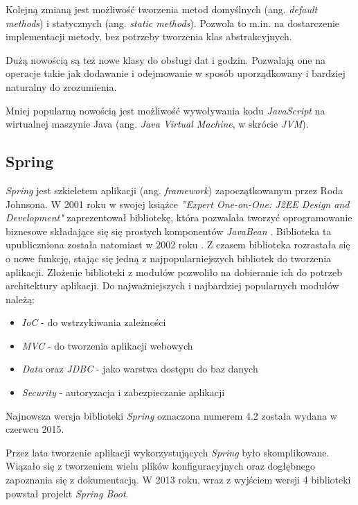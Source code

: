 Kolejną zmianą jest możliwość tworzenia metod domyślnych (ang. \textsl{default methods}) i statycznych (ang. \textsl{static methods}). Pozwola to m.in. na dostarczenie implementacji metody, bez potrzeby tworzenia klas abstrakcyjnych.

Dużą nowością są też nowe klasy do obsługi dat i godzin. Pozwalają one na operacje takie jak dodawanie i odejmowanie w sposób uporządkowany i bardziej naturalny do zrozumienia.

Mniej popularną nowością jest możliwość wywoływania kodu \textsl{JavaScript} na wirtualnej maszynie Java (ang. \textsl{Java Virtual Machine}, w skrócie \textsl{JVM}).

\subsection{Spring}
\textsl{Spring} jest szkieletem aplikacji (ang. \textsl{framework}) zapoczątkowanym przez Roda Johnsona. W 2001 roku w swojej książce \textsl{''Expert One-on-One: J2EE Design and Development"} zaprezentował bibliotekę, która pozwalała tworzyć oprogramowanie biznesowe składające się się prostych komponentów \textsl{JavaBean} \cite{jeedesign}. Biblioteka ta upubliczniona została natomiast w 2002 roku \cite{springinaction}. Z czasem biblioteka rozrastała się o nowe funkcję, stając się jedną z najpopularniejszych bibliotek do tworzenia aplikacji. Złożenie biblioteki z modułów pozwoliło na dobieranie ich do potrzeb architektury aplikacji. Do najważniejszych i najbardziej popularnych modułów należą:
\begin{itemize}
\item \textsl{IoC} - do wstrzykiwania zależności
\item \textsl{MVC} - do tworzenia aplikacji webowych
\item \textsl{Data} oraz \textsl{JDBC} - jako warstwa dostępu do baz danych
\item \textsl{Security} - autoryzacja i zabezpieczanie aplikacji
\end{itemize}
Najnowsza wersja biblioteki \textsl{Spring} oznaczona numerem 4.2 została wydana w czerwcu 2015.

Przez lata tworzenie aplikacji wykorzystujących \textsl{Spring} było skomplikowane. Wiązało się z tworzeniem wielu plików konfiguracyjnych oraz dogłębnego zapoznania się z dokumentacją. W 2013 roku, wraz z wyjściem wersji 4 biblioteki powstał projekt \textsl{Spring Boot}. 

